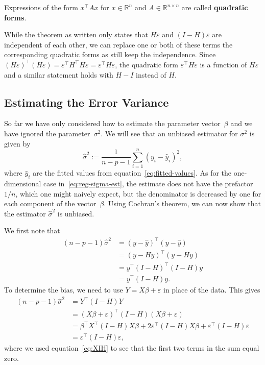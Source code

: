 \documentclass[
  a4paper,
]{article}
\theoremstyle{definition}
\theoremstyle{definition}
\theoremstyle{definition}
\theoremstyle{definition}
\theoremstyle{remark}
\begin{document}
Expressions of the form \(x^\top A x\) for \(x\in\mathbb{R}^n\) and \(A\in\mathbb{R}^{n\times n}\)
are called \textbf{quadratic forms}.

While the theorem as written only states that \(H \varepsilon\) and \((I - H)\varepsilon\)
are independent of each other, we can replace one or both of these terms
the corresponding quadratic forms as still keep the independence. Since
\((H \varepsilon)^\top (H \varepsilon) = \varepsilon^\top H^\top H \varepsilon= \varepsilon^\top H \varepsilon\),
the quadratic form \(\varepsilon^\top H \varepsilon\) is a function of \(H \varepsilon\) and a similar
statement holds with \(H-I\) instead of \(H\).

\hypertarget{var-est-bias}{%
\subsection{Estimating the Error Variance}\label{var-est-bias}}

So far we have only considered how to estimate the parameter
vector~\(\beta\) and we have ignored the parameter~\(\sigma^2\).
We will see that an unbiased estimator for \(\sigma^2\) is
given by
\begin{equation}
  \hat\sigma^2
  := \frac{1}{n-p-1} \sum_{i=1}^n (y_i - \hat y_i)^2, \label{eq:hat-sigma-squared}
\end{equation}
where \(\hat y_i\) are the fitted values from equation~\eqref{eq:fitted-values}.
As for the one-dimensional case in~\eqref{eq:reg-sigma-est}, the estimate
does not have the prefactor \(1/n\), which one might naively expect,
but the denominator is decreased by one for each component of the
vector~\(\beta\). Using Cochran's theorem, we can now show that the estimator
\(\hat\sigma^2\) is unbiased.

We first note that
\begin{align*}
  (n - p - 1) \hat\sigma^2
  &= (y - \hat y)^\top (y - \hat y) \\
  &= (y - H y)^\top (y - H y) \\
  &= y^\top (I - H)^\top (I - H) y \\
  &= y^\top (I - H) y.
\end{align*}
To determine the bias, we need to use \(Y = X\beta + \varepsilon\) in place of the
data. This gives
\begin{align*}
  (n - p - 1) \hat\sigma^2
  &= Y^\top (I-H) Y \\
  &= (X\beta + \varepsilon)^\top (I-H) (X\beta + \varepsilon) \\
  &= \beta^\top X^\top (I-H) X \beta
      + 2 \varepsilon^\top (I-H) X \beta
      + \varepsilon^\top (I-H) \varepsilon\\
  &= \varepsilon^\top (I-H) \varepsilon,
\end{align*}
where we used equation~\eqref{eq:XIH} to see that the first two terms in
the sum equal zero.
\end{document}
